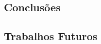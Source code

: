 \documentclass[article,12pt]{abntex2}
\begin{document}
\subsection{Conclusões}
\subsection{Trabalhos Futuros}





\nocite{Auer:2019}
\nocite{Tiburski:2019}
\nocite{Li:2019}
\nocite{Karmakar:2019}
\nocite{Oliveira:2018}
\nocite{Das:2018}
\nocite{Alphand:2018}
\nocite{Novo:2018}
\nocite{Stergiou:2017}
\nocite{Minoli:2017}
\end{document}
